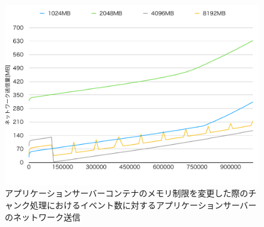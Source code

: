\documentclass[../../../../../main]{subfiles}
\begin{document}
    \begin{figure}[H]
        \centering
        \includegraphics[width=12cm]{graph}
        \caption{アプリケーションサーバーコンテナのメモリ制限を変更した際のチャンク処理におけるイベント数に対するアプリケーションサーバーのネットワーク送信}
        \label{fig:stream-change-app-memory-limit-app-net-out-app_4_db_1_1024}
    \end{figure}
\end{document}

